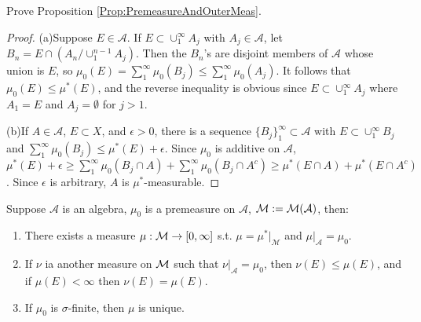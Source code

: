 \begin{exc}
    Prove Proposition \ref{Prop:PremeasureAndOuterMeas}.
\end{exc}
\begin{proof}
    (a)Suppose $E\in\mathcal{A}$. If $E\subset\cup_1^{\infty}A_j$ with $A_j\in\mathcal{A}$,
    let $B_n=E\cap(A_n/\cup_1^{n-1}A_j)$. Then the $B_n$'s are disjoint members of $\mathcal{A}$
    whose union is $E$, so $\mu_{0}(E)=\sum_1^{\infty}\mu_{0}(B_j)\leq\sum_1^{\infty}\mu_{0}(A_j)$.
    It follows that $\mu_{0}(E)\leq\mu^*(E)$, and the reverse inequality is obvious since           
    $E\subset\cup_{1}^{\infty}A_j$ where $A_1=E$ and $A_j=\emptyset$ for $j>1$.

    (b)If $A\in\mathcal{A}$, $E\subset X$, and $\epsilon>0$, there is a sequence
    $\{B_j\}_{1}^{\infty}\subset\mathcal{A}$ with $E\subset\cup_{1}^{\infty}B_j$
    and $\sum_{1}^{\infty}\mu_{0}(B_j)\leq\mu^*(E)+\epsilon$. Since $\mu_0$ is additive
    on $\mathcal{A}$, 
    $\mu^*(E)+\epsilon\geq\sum_{1}^{\infty}\mu_{0}(B_j\cap A)+\sum_{1}^{\infty}\mu_{0}(B_j\cap A^c)
    \geq\mu^*(E\cap A)+\mu^*(E\cap A^c)$. Since $\epsilon$ is arbitrary, $A$ is $\mu^*$-measurable.
\end{proof}
\begin{thm}
    \label{Thm:PremeasureExtension}
    Suppose $\mathcal{A}$ is an algebra, $\mu_{0}$ is a premeasure on 
    $\mathcal{A}$, $\mathcal{M}:=\mathcal{M}(\mathcal{A})$, then:
    \begin{enumerate}
        \item There exists a measure $\mu:\mathcal{M}\rightarrow[0,\infty]$ 
        s.t. $\mu=\mu^{*}|_{\mathcal{M}}$ and $\mu|_{\mathcal{A}}
        =\mu_{0}.$
        \item If $\nu$ ia another measure on $\mathcal{M}$ such that 
        $\nu|_{\mathcal{A}}=\mu_{0}$, then $\nu(E)\le\mu(E)$, 
        and if $\mu(E)<\infty$ then $\nu(E)=\mu(E)$.
        \item If $\mu_{0}$ is $\sigma$-finite, then $\mu$ is unique.
    \end{enumerate}
\end{thm}
